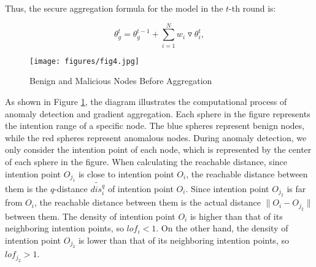\documentclass[lettersize,journal]{IEEEtran}
\begin{document}
Thus, the secure aggregation formula for the model in the $t$-th round is:

\begin{equation}
    \theta_g^t = \theta_g^{t-1}+\sum_{i=1}^{N}w_i\triangledown \theta_i^t,
\end{equation}


\begin{figure}[!t]
    \centering
    \texttt{[image: figures/fig4.jpg]}
    \caption{Benign and Malicious Nodes Before Aggregation}
    \label{fig:before-agg}
\end{figure}
As shown in Figure \ref{fig:before-agg}, the diagram illustrates the computational process of anomaly detection and gradient aggregation. Each sphere in the figure represents the intention range of a specific node. The blue spheres represent benign nodes, while the red spheres represent anomalous nodes. During anomaly detection, we only consider the intention point of each node, which is represented by the center of each sphere in the figure. When calculating the reachable distance, since intention point $O_{j_1}$ is close to intention point $O_i$, the reachable distance between them is the $q$-distance $\widetilde{dis_i^q}$ of intention point $O_i$. Since intention point $O_{j_2}$ is far from $O_i$, the reachable distance between them is the actual distance $\|O_i-O_{j_2}\|$ between them. The density of intention point $O_i$ is higher than that of its neighboring intention points, so $lof_i < 1$. On the other hand, the density of intention point $O_{j_2}$ is lower than that of its neighboring intention points, so $lof_{j_2} > 1$.
\end{document}
